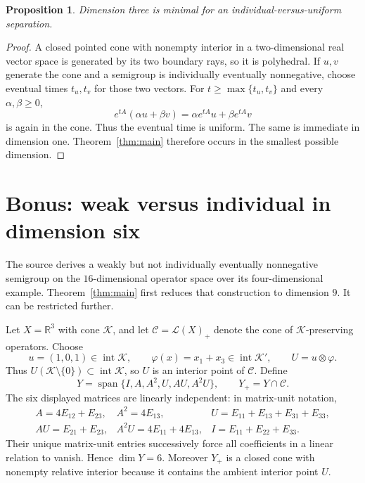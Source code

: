 \documentclass[11pt]{article}
\newtheorem{proposition}{Proposition}
\newcommand{\R}{\mathbb R}
\newcommand{\K}{\mathcal K}
\newcommand{\Lop}{\mathcal L}
\begin{document}
\begin{proposition}\label{prop:minimal}
Dimension three is minimal for an individual-versus-uniform separation.
\end{proposition}

\begin{proof}
A closed pointed cone with nonempty interior in a two-dimensional real vector
space is generated by its two boundary rays, so it is polyhedral.  If $u,v$
generate the cone and a semigroup is individually eventually nonnegative,
choose eventual times $t_u,t_v$ for those two vectors.  For
$t\geq\max\{t_u,t_v\}$ and every $\alpha,\beta\geq0$,
\[
 e^{tA}(\alpha u+\beta v)
 =\alpha e^{tA}u+\beta e^{tA}v
\]
is again in the cone.  Thus the eventual time is uniform.  The same is
immediate in dimension one.  Theorem~\ref{thm:main} therefore occurs in the
smallest possible dimension.
\end{proof}

\section{Bonus: weak versus individual in dimension six}

The source derives a weakly but not individually eventually nonnegative
semigroup on the $16$-dimensional operator space over its four-dimensional
example.  Theorem~\ref{thm:main} first reduces that construction to dimension
$9$.  It can be restricted further.

Let $X=\R^3$ with cone $\K$, and let $\mathcal C=\Lop(X)_+$ denote the cone of
$\K$-preserving operators.  Choose
\[
 u=(1,0,1)\in\operatorname{int}\K,\qquad
 \varphi(x)=x_1+x_3\in\operatorname{int}\K',\qquad
 U=u\otimes\varphi.
\]
Thus $U(\K\setminus\{0\})\subset\operatorname{int}\K$, so $U$ is an
interior point of $\mathcal C$.  Define
\begin{equation}\label{eq:Y}
 Y=\operatorname{span}\{I,A,A^2,U,AU,A^2U\},
 \qquad Y_+=Y\cap\mathcal C.
\end{equation}
The six displayed matrices are linearly independent: in matrix-unit notation,
\[
\begin{array}{lll}
 A=4E_{12}+E_{23},&A^2=4E_{13},&
 U=E_{11}+E_{13}+E_{31}+E_{33},\\
 AU=E_{21}+E_{23},&A^2U=4E_{11}+4E_{13},&I=E_{11}+E_{22}+E_{33}.
\end{array}
\]
Their unique matrix-unit entries successively force all coefficients in a
linear relation to vanish.  Hence $\dim Y=6$.  Moreover $Y_+$ is a closed cone
with nonempty relative interior because it contains the ambient interior point
$U$.
\end{document}
